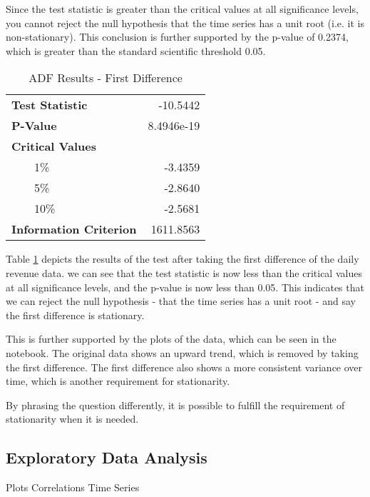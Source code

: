 Since the test statistic is greater than the critical values at all
significance levels, you cannot reject the null hypothesis that the time series
has a unit root (i.e. it is non-stationary). This conclusion is further
supported by the p-value of 0.2374, which is greater than the
standard scientific threshold 0.05.

\begin{table}[h]
\centering
\caption{ADF Results - First Difference}
\label{tab:adf_dif}
\begin{tabular}{@{} >{\arraybackslash}l r @{}}
\toprule
\textbf{Test Statistic} & -10.5442 \\ \addlinespace[0.1em]
\textbf{P-Value} & 8.4946e-19 \\ \addlinespace[0.1em]
\textbf{Critical Values} & \\ 
\ \ \ \ 1\% & -3.4359 \\ 
\ \ \ \ 5\% & -2.8640 \\ 
\ \ \ \ 10\% & -2.5681 \\ \addlinespace[0.1em]
\textbf{Information Criterion} & 1611.8563 \\ 
\bottomrule
\end{tabular}
\end{table}

Table \ref{tab:adf_dif} depicts the results of the test after taking the first
difference of the daily revenue data. we can see that the test statistic is now
less than the critical values at all significance levels, and the p-value is
now less than 0.05. This indicates that we can reject the null hypothesis -
that the time series has a unit root - and say the first difference is
stationary.

This is further supported by the plots of the data, which can be seen in the 
notebook. The original data shows an upward trend, which is removed by taking 
the first difference. The first difference also shows a more consistent 
variance over time, which is another requirement for stationarity.


By phrasing the question differently, it is possible to fulfill the requirement
of stationarity when it is needed.

\subsection{Exploratory Data Analysis}

Plots
Correlations
Time Series

